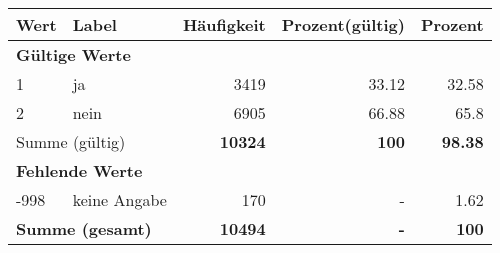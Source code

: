      \begin{longtable}{lXrrr}
     \toprule
     \textbf{Wert} & \textbf{Label} & \textbf{Häufigkeit} & \textbf{Prozent(gültig)} & \textbf{Prozent} \\
     \endhead
     \midrule
     \multicolumn{5}{l}{\textbf{Gültige Werte}}\\

     1 &
     \multicolumn{1}{X}{ ja   } &


       \num{3419} &
       \num[round-mode=places,round-precision=2]{33,12} &
         \num[round-mode=places,round-precision=2]{32,58} \\

     2 &
     \multicolumn{1}{X}{ nein   } &


       \num{6905} &
       \num[round-mode=places,round-precision=2]{66,88} &
         \num[round-mode=places,round-precision=2]{65,8} \\
     \midrule
     \multicolumn{2}{l}{Summe (gültig)} &
       \textbf{\num{10324}} &
     \textbf{100} &
       \textbf{\num[round-mode=places,round-precision=2]{98,38}} \\
     \multicolumn{5}{l}{\textbf{Fehlende Werte}}\\
       -998 &
       keine Angabe &
         \num{170} &
        - &
         \num[round-mode=places,round-precision=2]{1,62} \\
     \midrule
     \multicolumn{2}{l}{\textbf{Summe (gesamt)}} &
          \textbf{\num{10494}} &
        \textbf{-} &
        \textbf{100} \\
     \bottomrule
     \end{longtable}
     
